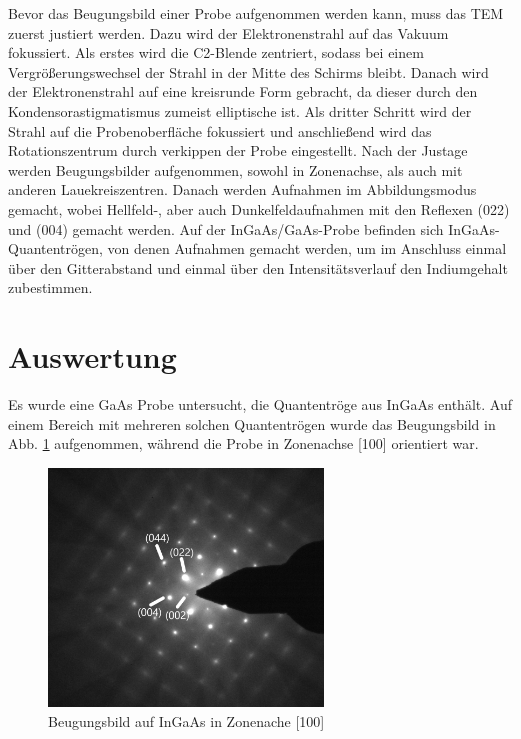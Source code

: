\documentclass[a4paper,11pt,DIV=11]{scrartcl}
\begin{document}
Bevor das Beugungsbild einer Probe aufgenommen werden kann, muss das TEM zuerst justiert werden. Dazu wird der Elektronenstrahl auf das Vakuum fokussiert. Als erstes wird die C2-Blende zentriert, sodass bei einem Vergrößerungswechsel der Strahl in der Mitte des Schirms bleibt. Danach wird der Elektronenstrahl auf eine kreisrunde Form gebracht, da dieser durch den Kondensorastigmatismus zumeist elliptische ist. Als dritter Schritt wird der Strahl auf die Probenoberfläche fokussiert und anschließend wird das Rotationszentrum durch verkippen der Probe eingestellt. Nach der Justage werden Beugungsbilder aufgenommen, sowohl in Zonenachse, als auch mit anderen Lauekreiszentren. Danach werden Aufnahmen im Abbildungsmodus gemacht, wobei Hellfeld-, aber auch Dunkelfeldaufnahmen mit den Reflexen (022) und (004) gemacht werden. Auf der InGaAs/GaAs-Probe befinden sich InGaAs-Quantentrögen, von denen Aufnahmen gemacht werden, um im Anschluss einmal über den Gitterabstand und einmal über den Intensitätsverlauf den Indiumgehalt zubestimmen.

\section{Auswertung}

Es wurde eine GaAs Probe untersucht, die Quantentröge aus InGaAs enthält. Auf einem Bereich mit mehreren solchen Quantentrögen wurde das Beugungsbild in Abb. \ref{100ind} aufgenommen, während die Probe in Zonenachse [100] orientiert war.

\begin{figure}[h]\centering
	\includegraphics[width=0.65\textwidth]{Versuchsdaten/8/indiziert2.png}
\caption{Beugungsbild auf InGaAs in Zonenache [100]}
\label{100ind}
\end{figure}
\end{document}
